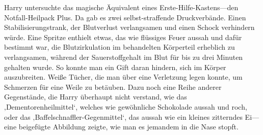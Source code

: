 Harry untersuchte das magische Äquivalent eines Erste-Hilfe-Kastens—den Notfall-Heilpack Plus. Da gab es zwei selbst-straffende Druckverbände. Einen Stabilisierungstrank, der Blutverlust verlangsamen und einen Schock verhindern würde. Eine Spritze enthielt etwas, das wie flüssiges Feuer aussah und dafür bestimmt war, die Blutzirkulation im behandelten Körperteil erheblich zu verlangsamen, während der Sauerstoffgehalt im Blut für bis zu drei Minuten gehalten wurde. So konnte man ein Gift daran hindern, sich im Körper auszubreiten. Weiße Tücher, die man über eine Verletzung legen konnte, um Schmerzen für eine Weile zu betäuben. Dazu noch eine Reihe anderer Gegenstände, die Harry überhaupt nicht verstand, wie das ‚Dementorenheilmittel‘, welches wie gewöhnliche Schokolade aussah und roch, oder das ‚Baffelschnaffler-Gegenmittel‘, das aussah wie ein kleines zitterndes Ei—eine beigefügte Abbildung zeigte, wie man es jemandem in die Nase stopft.

